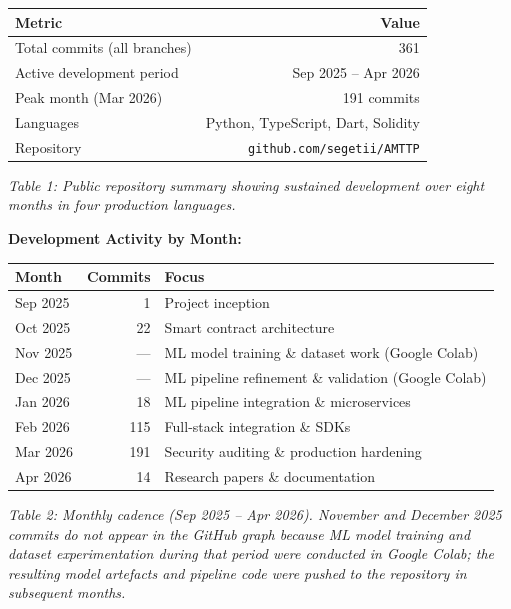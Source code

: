 \documentclass[11pt,a4paper]{article}
\begin{document}
\vspace{0.3cm}
\begin{center}
\begin{tabular}{|l|r|}
\hline
\textbf{Metric} & \textbf{Value} \\
\hline
Total commits (all branches) & 361 \\
Active development period & Sep 2025 -- Apr 2026 \\
Peak month (Mar 2026) & 191 commits \\
Languages & Python, TypeScript, Dart, Solidity \\
Repository & \texttt{github.com/segetii/AMTTP} \\
\hline
\end{tabular}
\end{center}
\vspace{0.1cm}
\textit{Table 1: Public repository summary showing sustained development over eight months in four production languages.}

\vspace{0.3cm}
\noindent\textbf{Development Activity by Month:}
\begin{center}
\begin{tabular}{|l|r|l|}
\hline
\textbf{Month} & \textbf{Commits} & \textbf{Focus} \\
\hline
Sep 2025 & 1 & Project inception \\
Oct 2025 & 22 & Smart contract architecture \\
Nov 2025 & --- & ML model training \& dataset work (Google Colab) \\
Dec 2025 & --- & ML pipeline refinement \& validation (Google Colab) \\
Jan 2026 & 18 & ML pipeline integration \& microservices \\
Feb 2026 & 115 & Full-stack integration \& SDKs \\
Mar 2026 & 191 & Security auditing \& production hardening \\
Apr 2026 & 14 & Research papers \& documentation \\
\hline
\end{tabular}
\end{center}
\vspace{0.1cm}
\textit{Table 2: Monthly cadence (Sep 2025 -- Apr 2026). November and December 2025 commits do not appear in the GitHub graph because ML model training and dataset experimentation during that period were conducted in Google Colab; the resulting model artefacts and pipeline code were pushed to the repository in subsequent months.}
\end{document}
